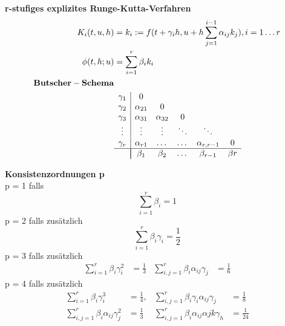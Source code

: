 \documentclass[
	ngerman,
	accentcolor=9c,%
	type=intern,
	marginpar=false
	]{tudapub}
\begin{document}
            \textbf{r-stufiges explizites Runge-Kutta-Verfahren}
            \begin{align*}
                K_i (t,u,h) &= k_i := f(t+\gamma_i h, u+h \sum_{j=1}^{i-1}\alpha_{ij}k_j), i = 1 \dots r\\
                \phi(t,h;u) &= \sum_{i=1}^r \beta_i k_i \\
                \mathbf{Butscher-Schema} & \\
                &
                \begin{array} {c | c c c c c}
                    \gamma_1 &  0\\
                    \gamma_2 &  \alpha_{21} & 0 \\
                    \gamma_3 &  \alpha_{31} & \alpha_{32} &  0\\
                    \vdots   &  \vdots & \vdots & \ddots &\ddots\\
                    \gamma_r &  \alpha_{r1} & \dots & \dots & \alpha_{r,r-1} & 0\\
                    \hline\\[-\normalbaselineskip]
                    & \beta_1 & \beta_2 & \dots & \beta_{r-1} & \beta{r}
                \end{array}
            \end{align*}
            \newpage
            \setcounter{satz}{6}
            \begin{satz}
                \textbf{Konsistenzordnungen p} \\
                p = 1 falls
                \begin{equation*}
                    \sum_{i=1}^r \beta_i = 1
                \end{equation*}
                p = 2 falls zusätzlich
                \begin{equation*}
                    \sum_{i=1}^r \beta_i \gamma_i = \frac{1}{2}
                \end{equation*}
                p = 3 falls zusätzlich
                \begin{align*}
                    \sum_{i=1}^r \beta_i \gamma_i^2 &= \frac{1}{3} & \sum_{i,j=1}^r \beta_i \alpha_{ij} \gamma_j &= \frac{1}{6}
                \end{align*}
                p = 4 falls zusätzlich
                \begin{align*}
                    \sum_{i=1}^r \beta_i \gamma_i^3 &= \frac{1}{4}, & \sum_{i,j=1}^r \beta_i \gamma_i \alpha_{ij} \gamma_j &= \frac{1}{8}\\
                    \sum_{i,j=1}^r \beta_i \alpha_{ij} \gamma_j^2 &= \frac{1}{3} & \sum_{i,j=1}^r \beta_i \alpha_{ij} \alpha{jk} \gamma_h &= \frac{1}{24}
                \end{align*}
            \end{satz}
\end{document}
